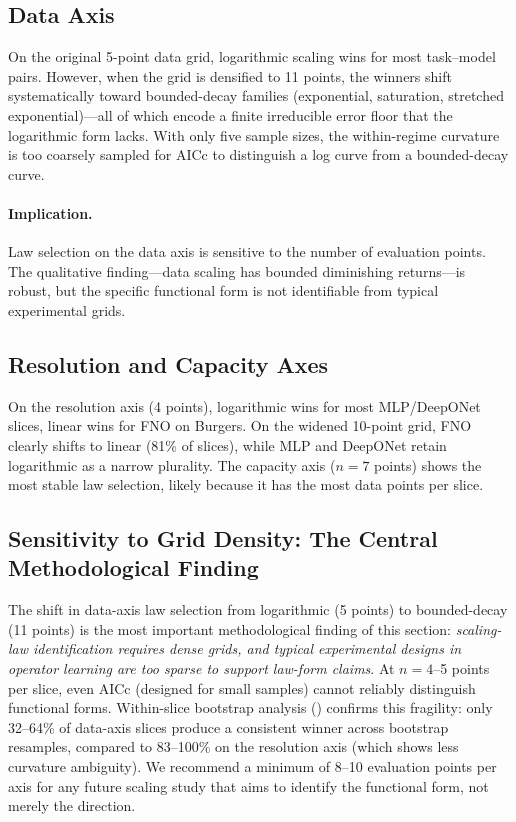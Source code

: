 \documentclass[11pt]{article}
\begin{document}
\subsection{Data Axis}
On the original 5-point data grid, logarithmic scaling wins for most
task--model pairs. However, when the grid is densified to 11 points,
the winners shift systematically toward bounded-decay families
(exponential, saturation, stretched exponential)---all of which encode
a finite irreducible error floor that the logarithmic form lacks.
With only five sample sizes, the within-regime curvature is too
coarsely sampled for AICc to distinguish a log curve from a
bounded-decay curve.

\paragraph{Implication.}
Law selection on the data axis is sensitive to the number of
evaluation points. The qualitative finding---data scaling has
bounded diminishing returns---is robust, but the specific
functional form is not identifiable from typical experimental
grids.

\subsection{Resolution and Capacity Axes}
On the resolution axis (4 points), logarithmic wins for most
MLP/DeepONet slices, linear wins for FNO on Burgers. On the
widened 10-point grid, FNO clearly shifts to linear (81\% of
slices), while MLP and DeepONet retain logarithmic as a narrow
plurality. The capacity axis ($n = 7$ points) shows the most
stable law selection, likely because it has the most data points
per slice.

\subsection{Sensitivity to Grid Density: The Central Methodological Finding}
\label{sec:grid-sensitivity}
The shift in data-axis law selection from logarithmic (5 points)
to bounded-decay (11 points) is the most important methodological
finding of this section:
\emph{scaling-law identification requires dense grids, and typical
experimental designs in operator learning are too sparse to support
law-form claims}.
At $n = 4$--5 points per slice, even AICc (designed for small
samples) cannot reliably distinguish functional forms.
Within-slice bootstrap analysis () confirms
this fragility: only 32--64\% of data-axis slices produce a
consistent winner across bootstrap resamples, compared to 83--100\%
on the resolution axis (which shows less curvature ambiguity).
We recommend a minimum of 8--10 evaluation points per axis for any
future scaling study that aims to identify the functional form, not
merely the direction.
\end{document}
